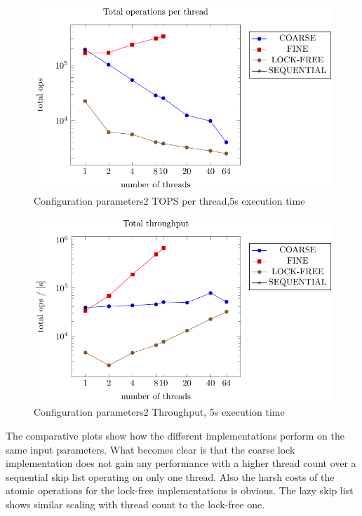 \documentclass{article}
\begin{document}
    \begin{figure}[H]
        \centering
        \includegraphics{../plots/parameters2_5s_per_thread.pdf}
        \caption{Configuration parameters2 TOPS per thread,5s execution time}
       
        \label{fig:parameters2_5s_per_thread}
    \end{figure}

    \begin{figure}[H]
        \centering
        \includegraphics{../plots/parameters2_5s_throughput.pdf}
        \caption{Configuration parameters2 Throughput, 5s execution time}
        \label{fig:arameters2_5s_throughput}
    \end{figure}

The comparative plots show how the different implementations perform on the same input parameters. 
What becomes clear is that the coarse lock implementation does not gain any performance with a higher thread count over a sequential skip list operating on only one thread. 
Also the harsh costs of the atomic operations for the lock-free implementations is obvious. The lazy skip list shows similar scaling with thread count to the lock-free one.
\end{document}
